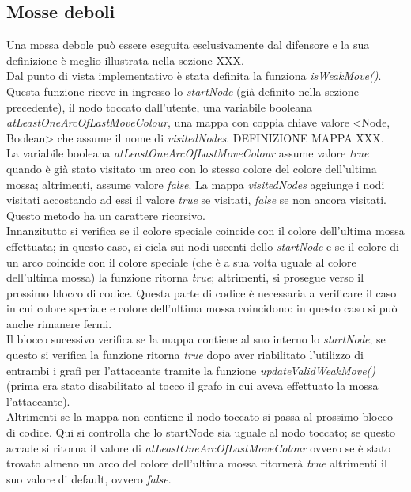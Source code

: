 \documentclass[a4paper,11pt,twoside,openright]{report}
\begin{document}
\subsection{Mosse deboli}
Una mossa debole può essere eseguita esclusivamente dal difensore e la sua definizione è meglio illustrata nella sezione XXX.\\
Dal punto di vista implementativo è stata definita la funziona \textit{isWeakMove()}. Questa funzione riceve in ingresso lo \textit{startNode} (già definito nella sezione precedente), il nodo toccato dall'utente, una variabile booleana \textit{atLeastOneArcOfLastMoveColour}, una mappa con coppia chiave valore <Node, Boolean> che assume il nome di \textit{visitedNodes}. DEFINIZIONE MAPPA XXX.\\
La variabile booleana \textit{atLeastOneArcOfLastMoveColour} assume valore \textit{true} quando è già stato visitato un arco con lo stesso colore del colore dell'ultima mossa; altrimenti, assume valore \textit{false}. La mappa \textit{visitedNodes} aggiunge i nodi visitati accostando ad essi il valore \textit{true} se visitati, \textit{false} se non ancora visitati.\\
Questo metodo ha un carattere ricorsivo.\\
Innanzitutto si verifica se il colore speciale coincide con il colore dell'ultima mossa effettuata; in questo caso, si cicla sui nodi uscenti dello \textit{startNode} e se il colore di un arco coincide con il colore speciale (che è a sua volta uguale al colore dell'ultima mossa) la funzione ritorna \textit{true}; altrimenti, si prosegue verso il prossimo blocco di codice. Questa parte di codice è necessaria a verificare il caso in cui colore speciale e colore dell'ultima mossa coincidono: in questo caso si può anche rimanere fermi.\\
Il blocco sucessivo verifica se la mappa contiene al suo interno lo \textit{startNode}; se questo si verifica la funzione ritorna \textit{true} dopo aver riabilitato l'utilizzo di entrambi i grafi per l'attaccante tramite la funzione \textit{updateValidWeakMove()} (prima era stato disabilitato al tocco il grafo in cui aveva effettuato la mossa l'attaccante).\\
Altrimenti se la mappa non contiene il nodo toccato si passa al prossimo blocco di codice. Qui si controlla che lo startNode sia uguale al nodo toccato; se questo accade si ritorna il valore di \textit{atLeastOneArcOfLastMoveColour} ovvero se è stato trovato almeno un arco del colore dell'ultima mossa ritornerà \textit{true} altrimenti il suo valore di default, ovvero \textit{false}.
\end{document}
